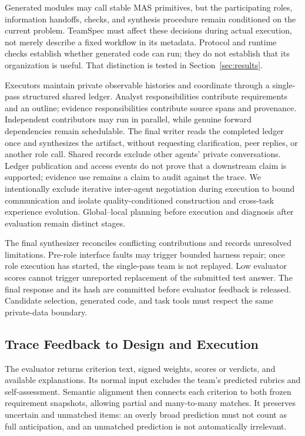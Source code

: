 \documentclass[11pt]{article}
\begin{document}
Generated modules may call stable MAS primitives, but the participating roles, information handoffs, checks, and synthesis procedure remain conditioned on the current problem. TeamSpec must affect these decisions during actual execution, not merely describe a fixed workflow in its metadata. Protocol and runtime checks establish whether generated code can run; they do not establish that its organization is useful. That distinction is tested in Section~\ref{sec:results}.

Executors maintain private observable histories and coordinate through a single-pass structured shared ledger. Analyst responsibilities contribute requirements and an outline; evidence responsibilities contribute source spans and provenance. Independent contributors may run in parallel, while genuine forward dependencies remain schedulable. The final writer reads the completed ledger once and synthesizes the artifact, without requesting clarification, peer replies, or another role call. Shared records exclude other agents' private conversations. Ledger publication and access events do not prove that a downstream claim is supported; evidence use remains a claim to audit against the trace. We intentionally exclude iterative inter-agent negotiation during execution to bound communication and isolate quality-conditioned construction and cross-task experience evolution. Global--local planning before execution and diagnosis after evaluation remain distinct stages.

The final synthesizer reconciles conflicting contributions and records unresolved limitations. Pre-role interface faults may trigger bounded harness repair; once role execution has started, the single-pass team is not replayed. Low evaluator scores cannot trigger unreported replacement of the submitted test answer. The final response and its hash are committed before evaluator feedback is released. Candidate selection, generated code, and task tools must respect the same private-data boundary.

\subsection{Trace Feedback to Design and Execution}
\label{sec:diagnosis}

The evaluator returns criterion text, signed weights, scores or verdicts, and available explanations. Its normal input excludes the team's predicted rubrics and self-assessment. Semantic alignment then connects each criterion to both frozen requirement snapshots, allowing partial and many-to-many matches. It preserves uncertain and unmatched items: an overly broad prediction must not count as full anticipation, and an unmatched prediction is not automatically irrelevant.
\end{document}

